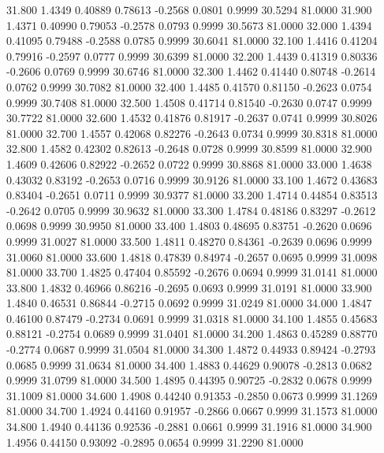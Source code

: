   31.800   1.4349   0.40889   0.78613  -0.2568   0.0801   0.9999  30.5294  81.0000
  31.900   1.4371   0.40990   0.79053  -0.2578   0.0793   0.9999  30.5673  81.0000
  32.000   1.4394   0.41095   0.79488  -0.2588   0.0785   0.9999  30.6041  81.0000
  32.100   1.4416   0.41204   0.79916  -0.2597   0.0777   0.9999  30.6399  81.0000
  32.200   1.4439   0.41319   0.80336  -0.2606   0.0769   0.9999  30.6746  81.0000
  32.300   1.4462   0.41440   0.80748  -0.2614   0.0762   0.9999  30.7082  81.0000
  32.400   1.4485   0.41570   0.81150  -0.2623   0.0754   0.9999  30.7408  81.0000
  32.500   1.4508   0.41714   0.81540  -0.2630   0.0747   0.9999  30.7722  81.0000
  32.600   1.4532   0.41876   0.81917  -0.2637   0.0741   0.9999  30.8026  81.0000
  32.700   1.4557   0.42068   0.82276  -0.2643   0.0734   0.9999  30.8318  81.0000
  32.800   1.4582   0.42302   0.82613  -0.2648   0.0728   0.9999  30.8599  81.0000
  32.900   1.4609   0.42606   0.82922  -0.2652   0.0722   0.9999  30.8868  81.0000
  33.000   1.4638   0.43032   0.83192  -0.2653   0.0716   0.9999  30.9126  81.0000
  33.100   1.4672   0.43683   0.83404  -0.2651   0.0711   0.9999  30.9377  81.0000
  33.200   1.4714   0.44854   0.83513  -0.2642   0.0705   0.9999  30.9632  81.0000
  33.300   1.4784   0.48186   0.83297  -0.2612   0.0698   0.9999  30.9950  81.0000
  33.400   1.4803   0.48695   0.83751  -0.2620   0.0696   0.9999  31.0027  81.0000
  33.500   1.4811   0.48270   0.84361  -0.2639   0.0696   0.9999  31.0060  81.0000
  33.600   1.4818   0.47839   0.84974  -0.2657   0.0695   0.9999  31.0098  81.0000
  33.700   1.4825   0.47404   0.85592  -0.2676   0.0694   0.9999  31.0141  81.0000
  33.800   1.4832   0.46966   0.86216  -0.2695   0.0693   0.9999  31.0191  81.0000
  33.900   1.4840   0.46531   0.86844  -0.2715   0.0692   0.9999  31.0249  81.0000
  34.000   1.4847   0.46100   0.87479  -0.2734   0.0691   0.9999  31.0318  81.0000
  34.100   1.4855   0.45683   0.88121  -0.2754   0.0689   0.9999  31.0401  81.0000
  34.200   1.4863   0.45289   0.88770  -0.2774   0.0687   0.9999  31.0504  81.0000
  34.300   1.4872   0.44933   0.89424  -0.2793   0.0685   0.9999  31.0634  81.0000
  34.400   1.4883   0.44629   0.90078  -0.2813   0.0682   0.9999  31.0799  81.0000
  34.500   1.4895   0.44395   0.90725  -0.2832   0.0678   0.9999  31.1009  81.0000
  34.600   1.4908   0.44240   0.91353  -0.2850   0.0673   0.9999  31.1269  81.0000
  34.700   1.4924   0.44160   0.91957  -0.2866   0.0667   0.9999  31.1573  81.0000
  34.800   1.4940   0.44136   0.92536  -0.2881   0.0661   0.9999  31.1916  81.0000
  34.900   1.4956   0.44150   0.93092  -0.2895   0.0654   0.9999  31.2290  81.0000
